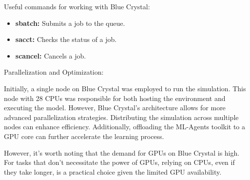 Useful commands for working with Blue Crystal:

\begin{itemize}
    \item \textbf{sbatch:} Submits a job to the queue.
    \item \textbf{sacct:} Checks the status of a job.
    \item \textbf{scancel:} Cancels a job.
\end{itemize}

Parallelization and Optimization:

Initially, a single node on Blue Crystal was employed to run the simulation. This node with 28 CPUs was responsible for both hosting the environment and executing the model. However, Blue Crystal's architecture allows for more advanced parallelization strategies. Distributing the simulation across multiple nodes can enhance efficiency. Additionally, offloading the ML-Agents toolkit to a GPU core can further accelerate the learning process.

However, it's worth noting that the demand for GPUs on Blue Crystal is high. For tasks that don't necessitate the power of GPUs, relying on CPUs, even if they take longer, is a practical choice given the limited GPU availability.

\label{sec:sec01}





